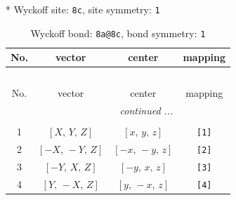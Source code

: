 \documentclass[fleqn,8pt]{jsarticle}
\begin{document}
* Wyckoff site: {\tt 8c}, site symmetry: {\tt 1}
\renewcommand{\arraystretch}{1.2}
\begin{longtable}{cccc}
\caption{Wyckoff bond: {\tt 8a@8c}, bond symmetry: {\tt 1}}
 \\
 \hline \hline
No. & vector & center & mapping \\ \hline \endfirsthead

\multicolumn{3}{l}{\tablename\ \thetable{}} \\
 \hline \hline
No. & vector & center & mapping \\ \hline \endhead

 \hline \hline
\multicolumn{3}{r}{\footnotesize\it continued ...} \\ \endfoot

 \hline \hline
\multicolumn{3}{r}{} \\ \endlastfoot

1 & $\left[ X,\, Y,\, Z \right]$ & $\left[ x,\, y,\, z \right]$ & {\tt [1]} \\ \hline
2 & $\left[ - X,\, - Y,\, Z \right]$ & $\left[ - x,\, - y,\, z \right]$ & {\tt [2]} \\ \hline
3 & $\left[ - Y,\, X,\, Z \right]$ & $\left[ - y,\, x,\, z \right]$ & {\tt [3]} \\ \hline
4 & $\left[ Y,\, - X,\, Z \right]$ & $\left[ y,\, - x,\, z \right]$ & {\tt [4]} \\
\end{longtable}
\end{document}

